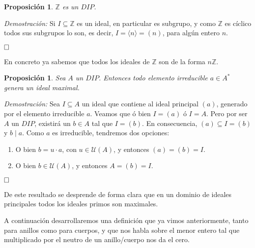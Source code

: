 \documentclass[12pt]{article}
\newtheorem{proposition}[theorem]{Proposición}
\begin{document}
\begin{proposition}$\mathbb{Z}$ es un $DIP$.
\end{proposition}
\emph{Demostración: }Si $I \subseteq \mathbb{Z}$ es un ideal, en particular es subgrupo, y como $\mathbb{Z}$ es cíclico todos sus subgrupos lo son, es decir, $I = \langle n \rangle = (n)$, para algún entero $n$. 

$\hfill \square$

En concreto ya sabemos que todos los ideales de $\mathbb{Z}$ son de la forma $n\mathbb{Z}$.

\begin{proposition} Sea $A$ un $DIP$. Entonces todo elemento irreducible $a \in A^{\ast}$ genera un ideal maximal.
\end{proposition}
\emph{Demostración: } Sea $I \subseteq A$ un ideal que contiene al ideal principal $(a)$, generado por el elemento irreducible $a$. Veamos que ó bien $I = (a)$ ó $I = A$. Pero por ser $A$ un $DIP$, existirá un $b \in A$ tal que $I = (b)$. En consecuencia, $(a) \subseteq I = (b)$ y $b \mid a$. Como $a$ es irreducible, tendremos dos opciones: \begin{enumerate}
\item O bien $b = u \cdot a$, con $u \in \mathcal{U}(A)$, y entonces $(a) = (b) = I$.
\item O bien $b \in \mathcal{U}(A)$, y entonces $A = (b) = I$.
\end{enumerate}

$\hfill \square$

De este resultado se desprende de forma clara que en un dominio de ideales principales todos los ideales primos son maximales.

A continuación desarrollaremos una definición que ya vimos anteriormente, tanto para anillos como para cuerpos, y que nos habla sobre el menor entero tal que multiplicado por el neutro de un anillo/cuerpo nos da el cero. 
\end{document}
